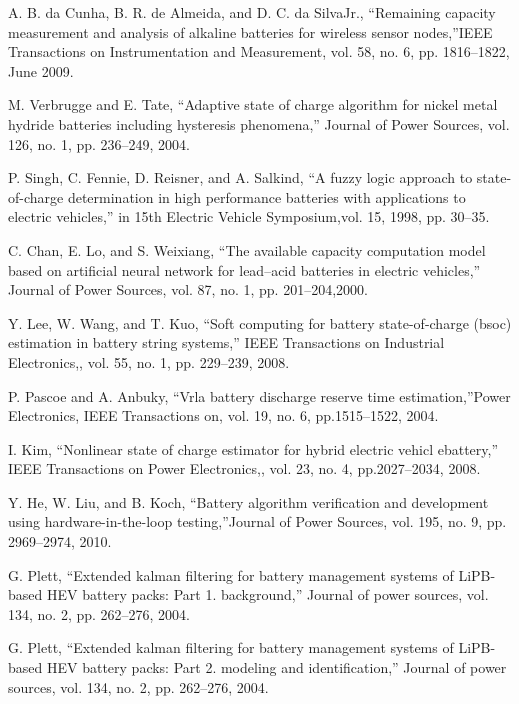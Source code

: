 A. B. da Cunha, B. R. de Almeida, and D. C. da SilvaJr., ``Remaining capacity  measurement  and  analysis  of  alkaline  batteries  for  wireless sensor nodes,''IEEE Transactions on Instrumentation and Measurement, vol. 58, no. 6, pp. 1816–1822, June 2009.

M.  Verbrugge  and  E.  Tate,  ``Adaptive  state  of  charge  algorithm  for nickel metal hydride batteries including hysteresis phenomena,'' Journal of Power Sources, vol. 126, no. 1, pp. 236–249, 2004.

 P. Singh, C. Fennie, D. Reisner, and A. Salkind, ``A fuzzy logic approach to  state-of-charge  determination  in  high  performance  batteries  with applications  to  electric  vehicles,''  in 15th  Electric  Vehicle  Symposium,vol. 15, 1998, pp. 30–35.

  C. Chan, E. Lo, and S. Weixiang, ``The available capacity computation model  based  on  artificial  neural  network  for  lead–acid  batteries  in electric vehicles,'' Journal of Power Sources, vol. 87, no. 1, pp. 201–204,2000.

 Y.  Lee,  W.  Wang,  and  T.  Kuo,  ``Soft  computing  for  battery  state-of-charge (bsoc) estimation in battery string systems,'' IEEE Transactions on Industrial Electronics,, vol. 55, no. 1, pp. 229–239, 2008.

 P.  Pascoe  and  A.  Anbuky, ``Vrla  battery  discharge  reserve  time  estimation,''Power  Electronics,  IEEE  Transactions  on,  vol.  19,  no.  6,  pp.1515–1522, 2004.

 I. Kim, ``Nonlinear state of charge estimator for hybrid electric vehicl ebattery,'' IEEE  Transactions  on  Power  Electronics,,  vol.  23,  no.  4,  pp.2027–2034, 2008.

 Y. He, W. Liu, and B. Koch, ``Battery algorithm verification and development using hardware-in-the-loop testing,''Journal of Power Sources, vol. 195, no. 9, pp. 2969–2974, 2010.

 G.  Plett, ``Extended  kalman  filtering  for  battery  management  systems of LiPB-based HEV battery packs: Part 1. background,'' Journal of power sources, vol. 134, no. 2, pp. 262–276, 2004.

G. Plett, ``Extended  kalman  filtering  for  battery  management  systems  of LiPB-based HEV battery  packs: Part 2. modeling and  identification,'' Journal of power sources, vol. 134, no. 2, pp. 262–276, 2004. 

